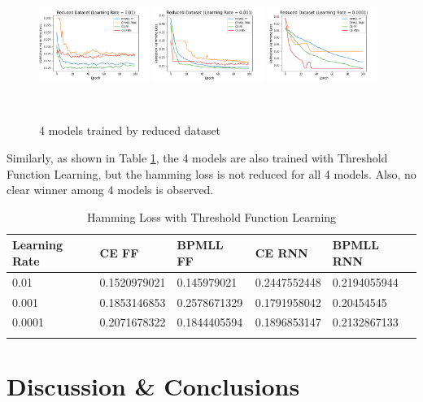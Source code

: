 \documentclass[11pt]{article}
\begin{document}
\begin{figure}[!htbp]
\centering 
        \includegraphics[width=0.32\textwidth,height=4.2cm]{Reduced_Dataset_Learning_Rate_01.png}
        \includegraphics[width=0.32\textwidth,height=4.2cm]{Reduced_Dataset_Learning_Rate_001.png}
        \includegraphics[width=0.32\textwidth,height=4.2cm]{Reduced_Dataset_Learning_Rate_0001.png}        
\caption[Original image and post processed image]{4 models trained by reduced dataset}
\label{fig:example2} 
\end{figure}

Similarly, as shown in Table \ref{PVFTT}, the 4 models are also trained with Threshold Function Learning, but the hamming loss is not reduced for all 4 models. Also, no clear winner among 4 models is observed. 
 \begin{longtable}[c]{| p{} | p{} |p{} |p{} |p{} |}
\hline
        Learning Rate  & CE FF & BPMLL FF &CE RNN &BPMLL RNN  \\
        \hline
         0.01 & 0.1520979021 & 0.145979021 & 0.2447552448 & 0.2194055944\\
        \hline
         0.001 & 0.1853146853 & 0.2578671329 & 0.1791958042 & 0.20454545\\
        \hline
         0.0001 & 0.2071678322 & 0.1844405594 & 0.1896853147 & 0.2132867133\\
        \hline        
\caption{Hamming Loss with Threshold Function Learning}
\label{PVFTT}
\end{longtable}
\section{Discussion \& Conclusions}

\newpage
\printbibliography
\end{document}
